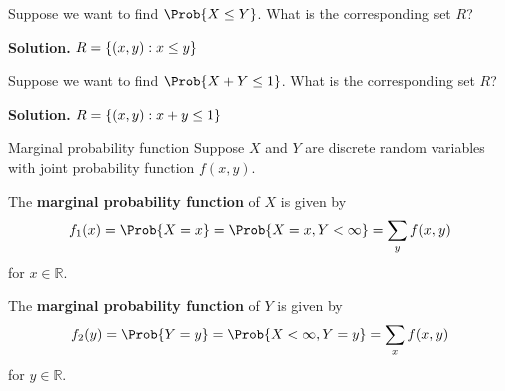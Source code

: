 \begin{Example}{}{}
    Suppose we want to find $ \Prob{X\le Y} $. What is the
    corresponding set $ R $?

    \textbf{Solution.} $ R=\{(x,y):x\le y\} $

    Suppose we want to find $ \Prob{X+Y\le 1} $. What is the corresponding
    set $ R $?

    \textbf{Solution.} $ R=\{(x,y):x+y\le 1\} $
\end{Example}

\begin{Definition}{Marginal probability function}{}
    Suppose $ X $ and $ Y $ are discrete
    random variables with joint probability
    function $ f(x,y) $.

    The \textbf{marginal probability
        function} of $ X $ is given by
    \[ f_1(x)=\Prob{X=x}
        =\Prob{X=x,Y<\infty}
        =\sum\limits_{y}f(x,y)  \]
    for $ x\in\mathbb{R} $.

    The \textbf{marginal probability function} of $ Y $
    is given by
    \[ f_2(y)=\Prob{Y=y}
        =\Prob{X<\infty,Y=y}
        =\sum\limits_{x}f(x,y)  \]
    for $ y\in\mathbb{R} $.
\end{Definition}


